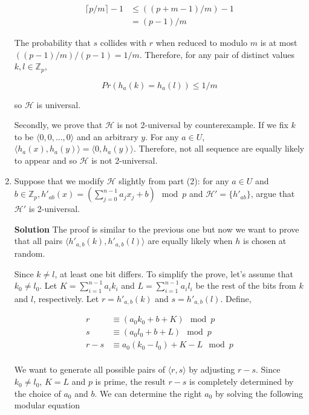 \documentclass[12pt, a4paper]{article} %
\newcommand\angles[1]{\langle #1 \rangle}
\begin{document}
\begin{enumerate}[label=(\alph*)]
    \begin{align*}
      \lceil p/m \rceil - 1 &\leq ((p + m - 1)/m) - 1 \\
                            &= (p - 1)/m
    \end{align*}

    The probability that $s$ collides with $r$ when reduced to modulo $m$ is at most $((p - 1)/m)/(p-1) = 1/m$.
    Therefore, for any pair of distinct  values $k, l \in \mathbb{Z}_{p}$,

    \begin{equation*}
      Pr(h_{a}(k) = h_{a}(l)) \leq 1/m
    \end{equation*}

    so $\mathcal{H}$ is universal.

    Secondly, we prove that $\mathcal{H}$ is not 2-universal by counterexample. If we fix $k$ to be $\langle 0, 0, \ldots, 0 \rangle$ and an arbitrary $y$. For any $a \in U$, $\langle h_{a}(x), h_a(y) \rangle = \langle 0, h_{a}(y)\rangle$. Therefore, not all sequence are equally likely to appear and so $\mathcal{H}$ is not 2-universal.

  \item Suppose that we modify $\mathcal{H}$ slightly from part (2): for any $a \in U$ and $b \in \mathbb{Z}_{p}, h'_{ab}(x) = (\sum_{j=0}^{n-1} a_{j}x_{j} + b) \mod p$ and $\mathcal{H}' = \{h'_{ab}\}$, argue that $\mathcal{H}'$ is 2-universal.

    \textbf{Solution} The proof is similar to the previous one but now we want to prove that
    all pairs $\angles{h'_{a,b}(k), h'_{a,b}(l)}$ are equally likely when $h$ is chosen at random.

    Since $k \neq l$, at least one bit differs. To simplify the prove, let's assume that $k_{0} \neq l_{0}$. Let $K = \sum_{i=1}^{n-1} a_{i}k_{i}$ and $L = \sum_{i=1}^{n-1} a_{i}l_{i}$ be the rest of the bits from $k$ and $l$, respectively. Let $r = h'_{a,b}(k)$ and $s = h'_{a,b}(l)$. Define,

    \begin{align*}
      r &\equiv (a_{0}k_{0} + b + K) \mod p\\
      s &\equiv (a_{0}l_{0} + b + L) \mod p\\
      r - s &\equiv a_{0}(k_{0} - l_{0}) + K - L \mod p\\
    \end{align*}

    We want to generate all possible pairs of $\angles{r, s}$ by adjusting $r - s$. Since $k_{0} \neq l_{0}$, $K = L$ and $p$ is prime, the result $r - s$ is completely determined by the choice of $a_{0}$ and $b$. We can determine the right $a_{0}$ by solving the following modular equation


\end{enumerate}
\end{document}
